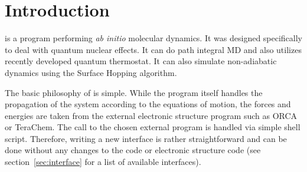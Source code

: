 \section{Introduction}
\abin is a program performing \textit{ab initio} molecular dynamics. It was designed specifically to deal with quantum nuclear effects. It can do path integral MD and also utilizes recently developed quantum thermostat\cite{Ceriotti2011}.
It can also simulate non-adiabatic dynamics using the Surface Hopping algorithm.

The basic philosophy of \abin is simple. While the program itself handles the propagation of the system according to the equations of motion, the forces and energies are taken from the external electronic structure program such as ORCA or TeraChem. The call to the chosen external program is handled via simple shell script. Therefore, writing a new interface is rather straightforward and can be done without any changes to the \abin code or electronic structure code (see section~\ref{sec:interface} for a list of available interfaces).

